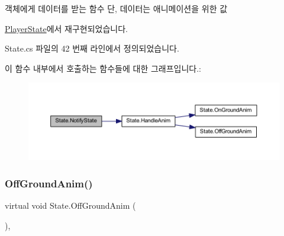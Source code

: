 객체에게 데이터를 받는 함수 단, 데이터는 애니메이션을 위한 값 



\mbox{\hyperlink{class_player_state_a59f3f64c24ba1b6e34e34cb23746ecb0}{Player\+State}}에서 재구현되었습니다.



State.\+cs 파일의 42 번째 라인에서 정의되었습니다.


\begin{DoxyCode}{0}

\end{DoxyCode}
이 함수 내부에서 호출하는 함수들에 대한 그래프입니다.\+:\nopagebreak
\begin{figure}[H]
\begin{center}
\leavevmode
\includegraphics[width=350pt]{d0/d8b/class_state_a989a27f9b711812d983344ee381da419_cgraph}
\end{center}
\end{figure}
\mbox{\label{class_state_a2909a234430fa7752fadf2bb993ab5e2}} 
\subsubsection{\texorpdfstring{OffGroundAnim()}{OffGroundAnim()}}
{\footnotesize\ttfamily virtual void State.\+Off\+Ground\+Anim (\begin{DoxyParamCaption}{ }\end{DoxyParamCaption})\hspace{0.3cm}{\ttfamily [protected]}, {\ttfamily [virtual]}}



